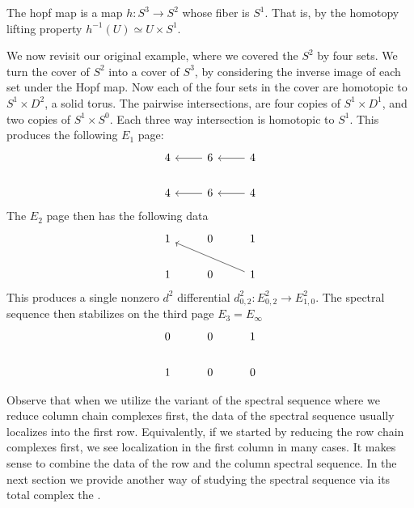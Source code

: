 The hopf map is a map  $h: S^3 \rightarrow S^2$ whose fiber is $S^1$. That is, by the homotopy lifting property $h^{-1}(U) \simeq U \times S^1$. 
\begin{example}
We now revisit our original example, where we covered the $S^2$ by four sets. We turn the cover of $S^2$ into a cover of $S^3$, by considering the inverse image of each set under the Hopf map. Now each of the four sets in the cover are homotopic to $S^1 \times D^2$, a solid torus. The pairwise intersections, are four copies of $S^1 \times D^1$, and two copies of $S^1 \times S^0$. Each three way intersection is homotopic to $S^1$.
This produces the following $E_1$ page:
\[ \begin{tikzcd}
4    &  \arrow{l} 6     & \arrow{l}   4   \\
4    & \arrow{l}  6     & \arrow{l}   4
\end{tikzcd} \]
The $E_2$ page then has the following data
\[
\begin{tikzcd}
1    &  0     &   1   \\
1   &  0     &   \arrow{llu}1
\end{tikzcd} 
\]
This produces a single nonzero $d^2$ differential $d^2_{0,2}: E^2_{0,2} \rightarrow E^2_{1,0}$.
The spectral sequence then stabilizes on the third page $E_3 = E_\infty$
\[
\begin{tikzcd}
0    &  0     &   1   \\
1   &  0     &    0
\end{tikzcd} 
\]
\end{example}

Observe that when we utilize the variant of the spectral sequence where we reduce column chain complexes first, the data of the spectral sequence usually localizes into the first row. Equivalently, if we started by reducing the row chain complexes first, we see localization in the first column in many cases. It makes sense to combine the data of the row and the column spectral sequence. In the next section we provide another way of studying the \mv spectral sequence via its total complex the \mvb. 